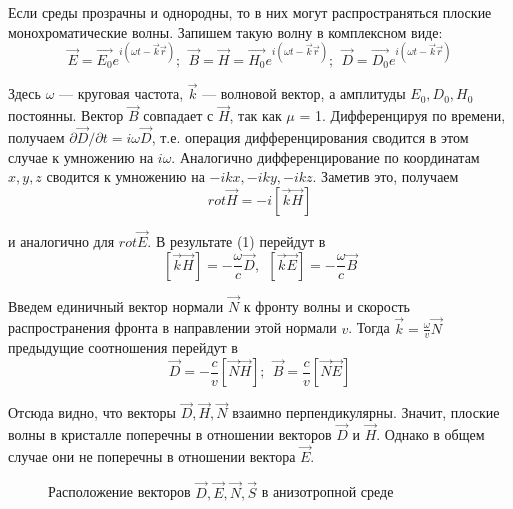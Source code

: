 \documentclass[14pt]{article}
\begin{document}
Если среды прозрачны и однородны, то в них могут распространяться
плоские монохроматические волны. Запишем такую волну в комплексном
виде:
$$
	\vec{E} = \vec{E_0}e^{i(\omega t - \vec{k}\vec{r})};~~\vec{B} = \vec{H} = \vec{H_0}e^{i(\omega t - \vec{k}\vec{r})};~~\vec{D} = \vec{D_0}e^{i(\omega t - \vec{k}\vec{r})}
$$

Здесь $\omega$ — круговая частота, $\vec{k}$ — волновой вектор, а амплитуды $E_0, D_0, H_0$ постоянны. Вектор $\vec{B}$
совпадает с $\vec{H}$, так как $\mu$ = 1. Дифференцируя
по времени, получаем $\partial\vec{D}/\partial t = i\omega\vec{D}$, т.е. операция дифференцирования
сводится в этом случае к умножению на $i\omega$. Аналогично дифференцирование
по координатам $x, y, z$ сводится к умножению на $−ikx, −iky, −ikz$.
Заметив это, получаем
$$
	rot\vec{H} = -i[\vec{k}\vec{H}]
$$

и аналогично для $rot\vec{E}$. В результате (1) перейдут в
$$
	[\vec{k}\vec{H}] = -\frac{\omega}{c}\vec{D},~~[\vec{k}\vec{E}] = -\frac{\omega}{c}\vec{B}
$$

Введем единичный вектор нормали
$\vec{N}$ к фронту волны и скорость распространения фронта в направлении этой нормали $v$. Тогда $\vec{k} = \frac{\omega}{v}\vec{N}$
предыдущие соотношения перейдут в
\begin{equation}
	\vec{D} = -\frac{c}{v}[\vec{N}\vec{H}];~~\vec{B} = \frac{c}{v}[\vec{N}\vec{E}]
\end{equation}

Отсюда видно, что векторы
$\vec{D}, \vec{H}, \vec{N}$ взаимно перпендикулярны. Значит,
плоские волны в кристалле поперечны в отношении векторов $\vec{D}$ и $\vec{H}$.
Однако в общем случае они не поперечны в отношении вектора $\vec{E}$.

\begin{figure}[h!]
	\caption{Расположение векторов $\vec{D}, \vec{E}, \vec{N}, \vec{S}$ в анизотропной среде}
	\label{fig:image}
\end{figure}
\end{document}
